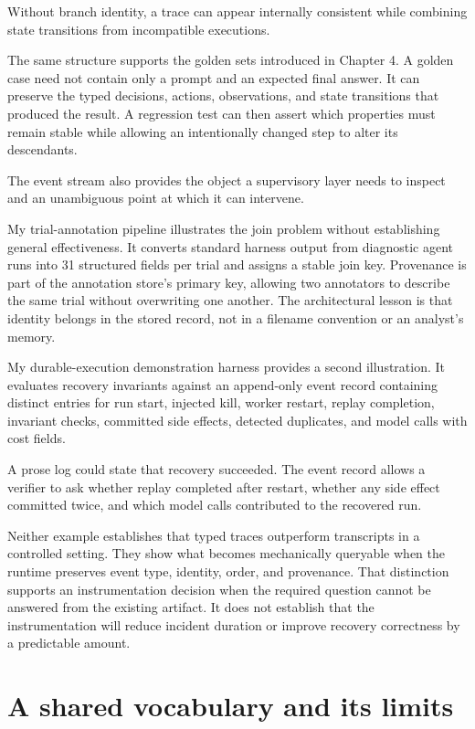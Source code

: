 Without branch identity, a trace can appear internally consistent while combining state transitions from incompatible executions.

The same structure supports the golden sets introduced in Chapter 4. A golden case need not contain only a prompt and an expected final answer. It can preserve the typed decisions, actions, observations, and state transitions that produced the result. A regression test can then assert which properties must remain stable while allowing an intentionally changed step to alter its descendants.

The event stream also provides the object a supervisory layer needs to inspect and an unambiguous point at which it can intervene.

My trial-annotation pipeline illustrates the join problem without establishing general effectiveness. It converts standard harness output from diagnostic agent runs into 31 structured fields per trial and assigns a stable join key. Provenance is part of the annotation store's primary key, allowing two annotators to describe the same trial without overwriting one another. The architectural lesson is that identity belongs in the stored record, not in a filename convention or an analyst's memory.

My durable-execution demonstration harness provides a second illustration. It evaluates recovery invariants against an append-only event record containing distinct entries for run start, injected kill, worker restart, replay completion, invariant checks, committed side effects, detected duplicates, and model calls with cost fields.

A prose log could state that recovery succeeded. The event record allows a verifier to ask whether replay completed after restart, whether any side effect committed twice, and which model calls contributed to the recovered run.

Neither example establishes that typed traces outperform transcripts in a controlled setting. They show what becomes mechanically queryable when the runtime preserves event type, identity, order, and provenance. That distinction supports an instrumentation decision when the required question cannot be answered from the existing artifact. It does not establish that the instrumentation will reduce incident duration or improve recovery correctness by a predictable amount.

\hypertarget{a-shared-vocabulary-and-its-limits}{%
\section{A shared vocabulary and its limits}\label{a-shared-vocabulary-and-its-limits}}

